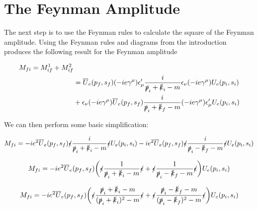 \documentclass[a4]{article}
\begin{document}
    \section*{The Feynman Amplitude}

    The next step is to use the Feynman rules to calculate the square of the Feynman amplitude. Using the Feynman rules and diagrams from the introduction produces the following result for the Feynman amplitude

    \begin{equation}
        \begin{aligned}
            M_{fi} = M_{if}^1 + M_{if}^2 & \\
            & = \overline{U}_e (p_f, s_f) (- i e \gamma^{\mu}) \epsilon_{\mu}' \frac{i}{\slashed{p}_i + \slashed{k}_i - m} \epsilon_{\nu} (- i e \gamma^{\mu}) U_e (p_i, s_i) \\
            & + \epsilon_{\nu} (- i e \gamma^{\mu}) \overline{U}_e (p_f, s_f) \frac{i}{\slashed{p}_i + \slashed{k}_f - m} (- i e \gamma^{\mu}) \epsilon_{\mu}' U_e (p_i, s_i)
        \end{aligned}
    \end{equation}

    We can then perform some basic simplification:

    \begin{equation}
        M_{fi} = - i e^2 \overline{U}_e (p_f, s_f) \slashed{\epsilon} \frac{i}{\slashed{p}_i + \slashed{k}_i - m} \slashed{\epsilon} U_e (p_i, s_i)
        - i e^2 \overline{U}_e (p_f, s_f) \slashed{\epsilon} \frac{i}{\slashed{p}_i - \slashed{k}_f - m} \slashed{\epsilon} U_e (p_i, s_i)
    \end{equation}

    \begin{equation}
        M_{fi} = - i e^2 \overline{U}_e (p_f, s_f) \bigg( \slashed{\epsilon} \frac{1}{\slashed{p}_i + \slashed{k}_i - m} \slashed{\epsilon} + \slashed{\epsilon} \frac{1}{\slashed{p}_i - \slashed{k}_f - m} \slashed{\epsilon} \bigg) U_e (p_i, s_i)
    \end{equation}

    \begin{equation}
        M_{fi} = - i e^2 \overline{U}_e (p_f, s_f) \bigg( \slashed{\epsilon} \frac{\slashed{p}_i + \slashed{k}_i - m}{(\slashed{p}_i + \slashed{k}_i)^2 - m} \slashed{\epsilon} + \slashed{\epsilon} \frac{\slashed{p}_i - \slashed{k}_f - m}{(\slashed{p}_i - \slashed{k}_f)^2 - m} \slashed{\epsilon} \bigg) U_e (p_i, s_i)
    \end{equation}
\end{document}
